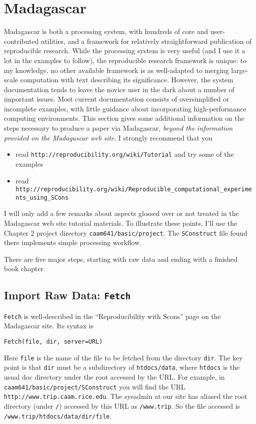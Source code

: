\section{Madagascar}
Madagascar is both a processing system, with hundreds of core and user-contributed utilities, and a framework for relatively straightforward publication of reproducible research. While the processing system is very useful (and I use it a lot in the examples to follow), the reproducible research framework is unique: to my knowledge, no other available framework is as well-adapted to merging large-scale computation with text describing its significance. However, the system documentation tends to leave the novice user in the dark about a number of important issues. Most current documentation consists of oversimplified or incomplete examples, with little guidance about incorporating high-performance computing environments. This section gives some additional information on the steps necessary to produce a paper via Madagascar, {\em beyond the information provided on the Madagascar web site}. I strongly recommend that you
\begin{itemize}
\item read {\tt http://reproducibility.org/wiki/Tutorial} and try some of the examples
\item read {\tt http://reproducibility.org/wiki/Reproducible\_}{\tt computational\_experiments\_using\_SCons}
\end{itemize}
I will only add a few remarks about aspects glossed over or not treated in the Madagascar web site tutorial materials. To illustrate these points, I'll use the Chapter 2 project directory {\tt caam641/basic/project}. The  {\tt SConstruct} file found there implements simple processing workflow.
 
There are five major steps, starting with raw data and ending with a finished book chapter. 

\subsection{Import Raw Data: {\tt Fetch}} 
{\tt Fetch} is well-described in the ``Reproducibility with Scons'' page on the Madagascar site. Its syntax is
\begin{verbatim}
Fetch(file, dir, server=URL)
\end{verbatim}
Here {\tt file} is the name of the file to be fetched from the directory {\tt dir}. The key point is that {\tt dir} must be a subdirectory of {\tt htdocs/data}, where {\tt htdocs} is the usual doc directory under the root accessed by the URL. For example, in {\tt caam641/basic/project/SConstruct} you will find the URL {\tt http://www.trip.caam.rice.edu}. The sysadmin at our site has aliased the root directory (under {\tt /}) accessed by this URL as {\tt /www.trip}. So the file accessed is {\tt /www.trip/htdocs/data/dir/file}.

